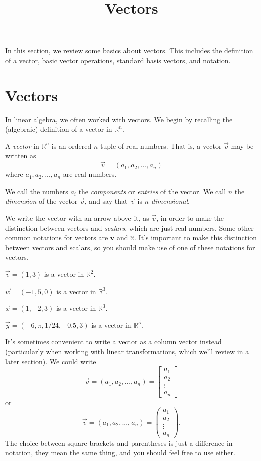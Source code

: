 \documentclass{ximera}
\title{Vectors}
\begin{document}
  
\begin{abstract}  
\end{abstract}  
\maketitle 

In this section, we review some basics about vectors. This includes the definition of a vector, basic vector operations, standard basis vectors, and notation.

\section{Vectors}

In linear algebra, we often worked with vectors. We begin by recalling the (algebraic) definition of a vector in $\mathbb{R}^n$.

\begin{definition}
A \emph{vector} in $\mathbb{R}^n$ is an ordered $n$-tuple of real numbers. That is, a vector $\vec{v}$ may be written as
\[
\vec{v} = (a_1,a_2,...,a_n)
\]
where $a_1,a_2,...,a_n$ are real numbers.

We call the numbers $a_i$ the \emph{components} or \emph{entries} of the vector. We call $n$ the \emph{dimension} of the vector $\vec{v}$, and say that $\vec{v}$ is \emph{$n$-dimensional}.
\end{definition}

We write the vector with an arrow above it, as $\vec{v}$, in order to make the distinction between vectors and \emph{scalars}, which are just real numbers. Some other common notations for vectors are $\mathbf{v}$ and $\hat{v}$. It's important to make this distinction between vectors and scalars, so you should make use of one of these notations for vectors.

\begin{example}
$\vec{v} = (1,3)$ is a vector in $\mathbb{R}^2$.

$\vec{w} = (-1,5,0)$ is a vector in $\mathbb{R}^3$.

$\vec{x} = (1,-2,3)$ is a vector in $\mathbb{R}^3$.

$\vec{y} = (-6,\pi, 1/24, -0.5, 3)$ is a vector in $\mathbb{R}^5$.
\end{example}

It's sometimes convenient to write a vector as a column vector instead (particularly when working with linear transformations, which we'll review in a later section). We could write
\[
\vec{v} = (a_1,a_2,...,a_n)=\left[\begin{array}{c}a_1\\a_2\\\vdots\\a_n\end{array}\right]
\]
or
\[
\vec{v} = (a_1,a_2,...,a_n)=\left(\begin{array}{c}a_1\\a_2\\\vdots\\a_n\end{array}\right).
\]
The choice between square brackets and parentheses is just a difference in notation, they mean the same thing, and you should feel free to use either.
\end{document}
